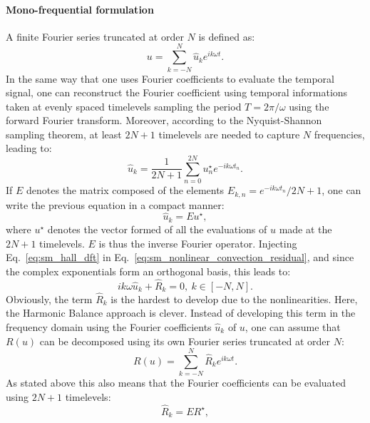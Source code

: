 \paragraph{Mono-frequential formulation}
A finite Fourier series truncated at order $N$ is defined as:
\begin{equation}
	u = \sum_{k=-N}^{N} 
	\widehat{u}_k e^{i k \omega t}.
	\label{eq:sm_hall_dft}
\end{equation}
In the same way that one uses Fourier coefficients to
evaluate the temporal signal,
one can reconstruct the Fourier coefficient using
temporal informations taken at evenly spaced timelevels
sampling the period $T = 2 \pi / \omega$ using the forward
Fourier transform. Moreover, 
according to the Nyquist-Shannon~\cite{Shannon1949} sampling theorem, 
at least $2N+1$ timelevels are needed to capture $N$ frequencies,
leading to:
\begin{equation}
	\widehat{u}_k = \frac{1}{2N+1} 
	\sum_{n=0}^{2N} u_n^\star e^{-i k \omega t_n}.
\end{equation}
If $E$ denotes the matrix composed of the elements 
$E_{k,n} = e^{-i k \omega t_n} / 2N+1$, one can write the previous equation
in a compact manner:
\begin{equation}
	\widehat{u}_k = E u^\star,
	\label{eq:sm_hall_idft}
\end{equation}
where $u^\star$ denotes the vector formed of all the evaluations of $u$
made at the $2N+1$ timelevels. $E$ is thus the inverse Fourier operator.
Injecting Eq.~\ref{eq:sm_hall_dft} in 
Eq.~\ref{eq:sm_nonlinear_convection_residual}, and since
the complex exponentials form an orthogonal basis, 
this leads to:
\begin{equation}
	i k \omega \widehat{u}_k + \widehat{R}_k = 0, \: k \in [-N, N].
	\label{eq:sm_hall_frequential_eq}
\end{equation}
Obviously, the term $\widehat{R}_k$ is the hardest to develop
due to the nonlinearities. Here, the Harmonic Balance approach
is clever. Instead of developing this term in the frequency domain
using the Fourier coefficients $\widehat{u}_k$ of $u$,
one can assume that $R(u)$ can be decomposed using its own Fourier series
truncated at order $N$:
\begin{equation}
	R(u) = \sum_{k=-N}^{N} 
	\widehat{R}_k e^{i k \omega t}.
\end{equation}
As stated above this also means that the Fourier coefficients
can be evaluated using $2N+1$ timelevels:
\begin{equation}
	\widehat{R}_k = E R^\star,
\end{equation}

